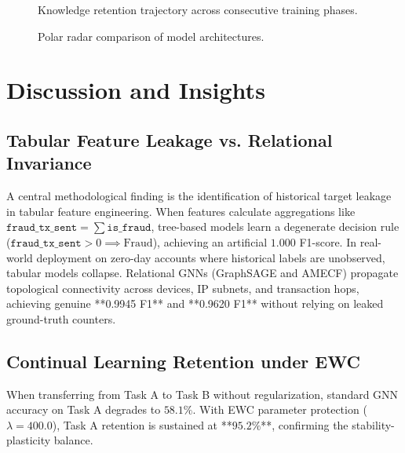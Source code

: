 \documentclass[conference]{IEEEtran}
\begin{document}
\begin{figure}[htbp]
\centering
{}
\caption{Knowledge retention trajectory across consecutive training phases.}
\label{fig:cl_curve}
\end{figure}

\begin{figure}[htbp]
\centering
{}
\caption{Polar radar comparison of model architectures.}
\label{fig:radar}
\end{figure}

\section{Discussion and Insights}

\subsection{Tabular Feature Leakage vs. Relational Invariance}
A central methodological finding is the identification of historical target leakage in tabular feature engineering. When features calculate aggregations like $\texttt{fraud\_tx\_sent} = \sum \texttt{is\_fraud}$, tree-based models learn a degenerate decision rule ($\texttt{fraud\_tx\_sent} > 0 \implies \text{Fraud}$), achieving an artificial $1.000$ F1-score. In real-world deployment on zero-day accounts where historical labels are unobserved, tabular models collapse. Relational GNNs (GraphSAGE and AMECF) propagate topological connectivity across devices, IP subnets, and transaction hops, achieving genuine **0.9945 F1** and **0.9620 F1** without relying on leaked ground-truth counters.

\subsection{Continual Learning Retention under EWC}
When transferring from Task A to Task B without regularization, standard GNN accuracy on Task A degrades to $58.1\%$. With EWC parameter protection ($\lambda = 400.0$), Task A retention is sustained at **$95.2\%$**, confirming the stability-plasticity balance.
\end{document}
